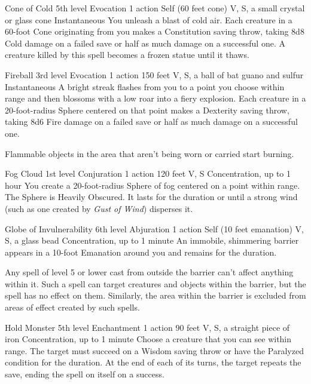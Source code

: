 \documentclass[10pt,a4paper,twoside,bg=print,twocolumn,openany,nodeprecatedcode]{dndbook}
\begin{document}
\mainmatter

\DndSpellHeader%
{Cone of Cold}
{5th level Evocation}
{1 action}
{Self (60 feet cone)}
{V, S, a small crystal or glass cone}
{Instantaneous}
You unleash a blast of cold air. Each creature in a 60-foot Cone originating from you makes a Constitution saving throw, taking 8d8 Cold damage on a failed save or half as much damage on a successful one. A creature killed by this spell becomes a frozen statue until it thaws.



\DndSpellHeader%
{Fireball}
{3rd level Evocation}
{1 action}
{150 feet}
{V, S, a ball of bat guano and sulfur}
{Instantaneous}
A bright streak flashes from you to a point you choose within range and then blossoms with a low roar into a fiery explosion. Each creature in a 20-foot-radius Sphere centered on that point makes a Dexterity saving throw, taking 8d6 Fire damage on a failed save or half as much damage on a successful one.

Flammable objects in the area that aren't being worn or carried start burning.



\DndSpellHeader%
{Fog Cloud}
{1st level Conjuration}
{1 action}
{120 feet}
{V, S}
{Concentration, up to 1 hour}
You create a 20-foot-radius Sphere of fog centered on a point within range. The Sphere is Heavily Obscured. It lasts for the duration or until a strong wind (such as one created by \textit{Gust of Wind}) disperses it.



\DndSpellHeader%
{Globe of Invulnerability}
{6th level Abjuration}
{1 action}
{Self (10 feet emanation)}
{V, S, a glass bead}
{Concentration, up to 1 minute}
An immobile, shimmering barrier appears in a 10-foot Emanation around you and remains for the duration.

Any spell of level 5 or lower cast from outside the barrier can't affect anything within it. Such a spell can target creatures and objects within the barrier, but the spell has no effect on them. Similarly, the area within the barrier is excluded from areas of effect created by such spells.



\DndSpellHeader%
{Hold Monster}
{5th level Enchantment}
{1 action}
{90 feet}
{V, S, a straight piece of iron}
{Concentration, up to 1 minute}
Choose a creature that you can see within range. The target must succeed on a Wisdom saving throw or have the Paralyzed condition for the duration. At the end of each of its turns, the target repeats the save, ending the spell on itself on a success.
\end{document}
